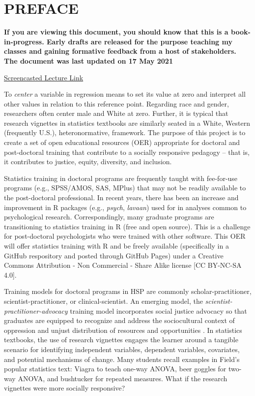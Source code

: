 \documentclass[
  english,
]{book}
\begin{document}
\hypertarget{preface}{%
\chapter*{PREFACE}\label{preface}}

\textbf{If you are viewing this document, you should know that this is a book-in-progress. Early drafts are released for the purpose teaching my classes and gaining formative feedback from a host of stakeholders. The document was last updated on 17 May 2021}

\href{https://spu.hosted.panopto.com/Panopto/Pages/Viewer.aspx?id=c932455e-ef06-444a-bdca-acf7012d759a}{Screencasted Lecture Link}

To \emph{center} a variable in regression means to set its value at zero and interpret all other values in relation to this reference point. Regarding race and gender, researchers often center male and White at zero. Further, it is typical that research vignettes in statistics textbooks are similarly seated in a White, Western (frequently U.S.), heteronormative, framework. The purpose of this project is to create a set of open educational resources (OER) appropriate for doctoral and post-doctoral training that contribute to a socially responsive pedagogy -- that is, it contributes to justice, equity, diversity, and inclusion.

Statistics training in doctoral programs are frequently taught with fee-for-use programs (e.g., SPSS/AMOS, SAS, MPlus) that may not be readily available to the post-doctoral professional. In recent years, there has been an increase and improvement in R packages (e.g., \emph{psych}, \emph{lavaan}) used for in analyses common to psychological research. Correspondingly, many graduate programs are transitioning to statistics training in R (free and open source). This is a challenge for post-doctoral psychologists who were trained with other software. This OER will offer statistics training with R and be freely available (specifically in a GitHub respository and posted through GitHub Pages) under a Creative Commons Attribution - Non Commercial - Share Alike license {[}CC BY-NC-SA 4.0{]}.

Training models for doctoral programs in HSP are commonly scholar-practitioner, scientist-practitioner, or clinical-scientist. An emerging model, the \emph{scientist-practitioner-advocacy} training model incorporates social justice advocacy so that graduates are equipped to recognize and address the sociocultural context of oppression and unjust distribution of resources and opportunities \citep{mallinckrodt_scientist-practitioner-advocate_2014}. In statistics textbooks, the use of research vignettes engages the learner around a tangible scenario for identifying independent variables, dependent variables, covariates, and potential mechanisms of change. Many students recall examples in Field's \citeyearpar{field_discovering_2012} popular statistics text: Viagra to teach one-way ANOVA, beer goggles for two-way ANOVA, and bushtucker for repeated measures. What if the research vignettes were more socially responsive?
\end{document}
